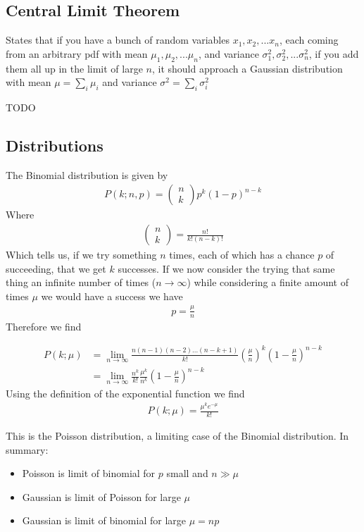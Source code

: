 \subsection{Central Limit Theorem}
States that if you have a bunch of random variables $x_1, x_2, ... x_n$, each coming from an arbitrary pdf with mean $\mu_1, \mu_2, ... \mu_n$, and variance $\sigma_1^2, \sigma_2^2, ...\sigma_n^2$, if you add them all up in the limit of large $n$, it should approach a Gaussian distribution with mean $\mu = \sum_i \mu_i$ and variance $\sigma^2 = \sum_i\sigma_i^2$

TODO

\subsection{Distributions}
The Binomial distribution is given by
\begin{align}
P(k;n,p) = \begin{pmatrix}
n\\
k
\end{pmatrix}p^k(1-p)^{n-k}
\end{align}
Where 
\begin{align}
\begin{pmatrix}
n\\
k
\end{pmatrix} = \frac{n!}{k!(n-k)!}
\end{align}
Which tells us, if we try something $n$ times, each of which has a chance $p$ of succeeding, that we get $k$ successes. If we now consider the trying that same thing an infinite number of times ($n\rightarrow\infty$) while considering a finite amount of times $\mu$ we would have a success we have
\begin{align}
p = \frac{\mu}{n}
\end{align}
Therefore we find

\begin{align}
P(k; \mu) &= \lim_{n\to \infty} \frac{n(n-1)(n-2)...(n-k+1)}{k!}\left(\frac{\mu}{n}\right)^k\left(1-\frac{\mu}{n}\right)^{n-k}\\
&= \lim_{n\to \infty}\frac{n^k}{k!}\frac{\mu^k}{n^k}\left(1-\frac{\mu}{n}\right)^{n-k}
\end{align}
Using the definition of the exponential function we find
\begin{align}
P(k; \mu) = \frac{\mu^ke^{-\mu}}{k!}
\end{align}

This is the Poisson distribution, a limiting case of the Binomial distribution.
In summary:
\begin{itemize}
	\item Poisson is limit of binomial for $p$ small and $n\gg \mu$
	\item Gaussian is limit of Poisson for large $\mu$
	\item Gaussian is limit of binomial for large $\mu=np$
\end{itemize}

